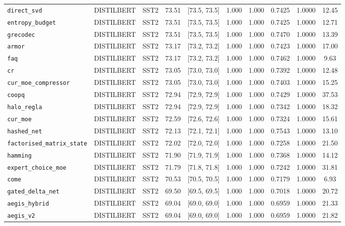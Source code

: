 \begin{table}[t]
\begin{tabular}{l l l c c c c c c c}
\texttt{direct\_svd} & DISTILBERT & SST2 & 73.51 & [73.5, 73.5] & 1.000 & 1.000 & 0.7425 & 1.0000 & 12.45 \\
\texttt{entropy\_budget} & DISTILBERT & SST2 & 73.51 & [73.5, 73.5] & 1.000 & 1.000 & 0.7425 & 1.0000 & 12.71 \\
\texttt{grecodec} & DISTILBERT & SST2 & 73.51 & [73.5, 73.5] & 1.000 & 1.000 & 0.7470 & 1.0000 & 13.39 \\
\texttt{armor} & DISTILBERT & SST2 & 73.17 & [73.2, 73.2] & 1.000 & 1.000 & 0.7423 & 1.0000 & 17.00 \\
\texttt{faq} & DISTILBERT & SST2 & 73.17 & [73.2, 73.2] & 1.000 & 1.000 & 0.7462 & 1.0000 & 9.63 \\
\texttt{cr} & DISTILBERT & SST2 & 73.05 & [73.0, 73.0] & 1.000 & 1.000 & 0.7392 & 1.0000 & 12.48 \\
\texttt{cur\_moe\_compressor} & DISTILBERT & SST2 & 73.05 & [73.0, 73.0] & 1.000 & 1.000 & 0.7403 & 1.0000 & 15.25 \\
\texttt{coopq} & DISTILBERT & SST2 & 72.94 & [72.9, 72.9] & 1.000 & 1.000 & 0.7429 & 1.0000 & 37.53 \\
\texttt{halo\_regla} & DISTILBERT & SST2 & 72.94 & [72.9, 72.9] & 1.000 & 1.000 & 0.7342 & 1.0000 & 18.32 \\
\texttt{cur\_moe} & DISTILBERT & SST2 & 72.59 & [72.6, 72.6] & 1.000 & 1.000 & 0.7324 & 1.0000 & 15.61 \\
\texttt{hashed\_net} & DISTILBERT & SST2 & 72.13 & [72.1, 72.1] & 1.000 & 1.000 & 0.7543 & 1.0000 & 13.10 \\
\texttt{factorised\_matrix\_state} & DISTILBERT & SST2 & 72.02 & [72.0, 72.0] & 1.000 & 1.000 & 0.7258 & 1.0000 & 21.50 \\
\texttt{hamming} & DISTILBERT & SST2 & 71.90 & [71.9, 71.9] & 1.000 & 1.000 & 0.7368 & 1.0000 & 14.12 \\
\texttt{expert\_choice\_moe} & DISTILBERT & SST2 & 71.79 & [71.8, 71.8] & 1.000 & 1.000 & 0.7242 & 1.0000 & 31.81 \\
\texttt{come} & DISTILBERT & SST2 & 70.53 & [70.5, 70.5] & 1.000 & 1.000 & 0.7179 & 1.0000 & 6.93 \\
\texttt{gated\_delta\_net} & DISTILBERT & SST2 & 69.50 & [69.5, 69.5] & 1.000 & 1.000 & 0.7018 & 1.0000 & 20.72 \\
\texttt{aegis\_hybrid} & DISTILBERT & SST2 & 69.04 & [69.0, 69.0] & 1.000 & 1.000 & 0.6959 & 1.0000 & 21.33 \\
\texttt{aegis\_v2} & DISTILBERT & SST2 & 69.04 & [69.0, 69.0] & 1.000 & 1.000 & 0.6959 & 1.0000 & 21.82 \\

\end{tabular}
\end{table}
